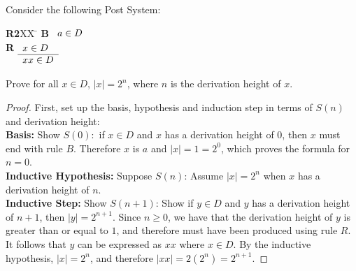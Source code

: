 \documentclass[]{exam}
\begin{document}
\begin{questions}
\begin{enumerate}[label=\alph*)]
\begin{solution}
\end{solution}
\end{enumerate}

\question Consider the following Post System:
\begin{tabbing}
{\bf R2}XX \=  \kill
{\bf B} \>
        \(\begin{array}[t]{l}
        a \in D
        \end{array}\) \\[2ex]
{\bf R} \>
        \(\begin{array}[t]{l}
        x \in D \\
        \hline
        xx \in D
        \end{array}\) 
\end{tabbing}

Prove for all $x \in D$, $|x| = 2^n$, where $n$ is the derivation height
of $x$. 
\begin{solution}
\begin{proof}
First, set up the basis, hypothesis and induction step in terms of $S(n)$ and
derivation height:
~\\
\textbf{Basis:} Show $S(0):$ if $x \in D$ and $x$ has a derivation height of
$0$, then $x$ must end with rule $B$. Therefore $x$ is $a$ and $|x| = 1 = 2^0$,
which proves the formula for $n = 0$.
~\\
\textbf{Inductive Hypothesis:} Suppose $S(n)$: Assume $|x| = 2^n$ when $x$ has 
a derivation height of $n$.
~\\
\textbf{Inductive Step:} Show $S(n+1)$: Show if $y \in D$ and $y$ has a
derivation height of $n + 1$, then $|y| = 2^{n + 1}$. Since $n \geq 0$,
we have that the derivation height of $y$ is greater than or equal to
$1$, and therefore must have been produced using rule $R$. It follows
that $y$ can be expressed as $xx$ where $x \in D$. By the inductive hypothesis,
$|x| = 2^n$, and therefore $|xx| = 2(2^n) = 2^{n+1}$.
\end{proof}

\end{solution}


\end{questions}
\end{document}
